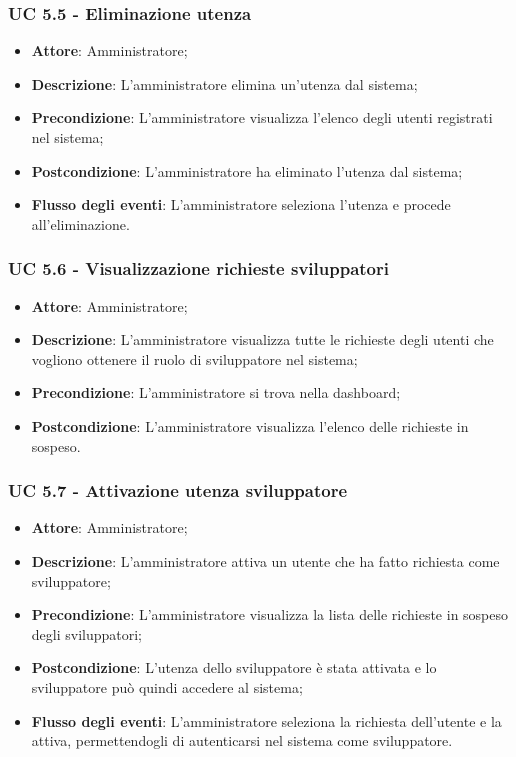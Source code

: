 \subsubsection{UC 5.5 - Eliminazione utenza}
\begin{itemize}
\item \textbf{Attore}: Amministratore;
\item \textbf{Descrizione}: L'amministratore elimina un'utenza dal sistema;
\item \textbf{Precondizione}: L'amministratore visualizza l'elenco degli utenti registrati nel sistema;
\item \textbf{Postcondizione}: L'amministratore ha eliminato l'utenza dal sistema;
\item \textbf{Flusso degli eventi}: L'amministratore seleziona l'utenza e procede all'eliminazione.
\end{itemize}


\subsubsection{UC 5.6 - Visualizzazione richieste sviluppatori}
\begin{itemize}
\item \textbf{Attore}: Amministratore;
\item \textbf{Descrizione}: L'amministratore visualizza tutte le richieste degli utenti che vogliono ottenere il ruolo di sviluppatore nel sistema;
\item \textbf{Precondizione}: L'amministratore si trova nella dashboard;
\item \textbf{Postcondizione}: L'amministratore visualizza l'elenco delle richieste in sospeso.
\end{itemize}

\subsubsection{UC 5.7 - Attivazione utenza sviluppatore}
\begin{itemize}
\item \textbf{Attore}: Amministratore;
\item \textbf{Descrizione}: L'amministratore attiva un utente che ha fatto richiesta come sviluppatore;
\item \textbf{Precondizione}: L'amministratore visualizza la lista delle richieste in sospeso degli sviluppatori;
\item \textbf{Postcondizione}: L'utenza dello sviluppatore è stata attivata e lo sviluppatore può quindi accedere al sistema;
\item \textbf{Flusso degli eventi}:  L'amministratore seleziona la richiesta dell'utente e la attiva, permettendogli di autenticarsi nel sistema come sviluppatore.
\end{itemize}

